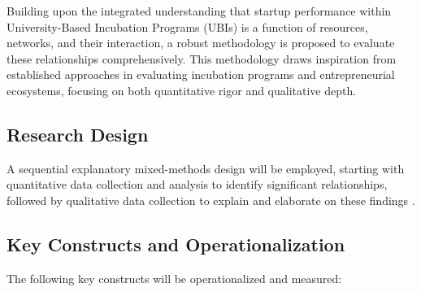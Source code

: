 \documentclass[../Main.tex]{subfiles}
\begin{document}
Building upon the integrated understanding that startup performance within University-Based Incubation Programs (UBIs) is a function of resources, networks, and their interaction, a robust methodology is proposed to evaluate these relationships comprehensively. This methodology draws inspiration from established approaches in evaluating incubation programs and entrepreneurial ecosystems, focusing on both quantitative rigor and qualitative depth.

\subsection{Research Design}
A sequential explanatory mixed-methods design will be employed, starting with quantitative data collection and analysis to identify significant relationships, followed by qualitative data collection to explain and elaborate on these findings \cite{creswell2014research}.

\subsection{Key Constructs and Operationalization}
The following key constructs will be operationalized and measured:
\end{document}
